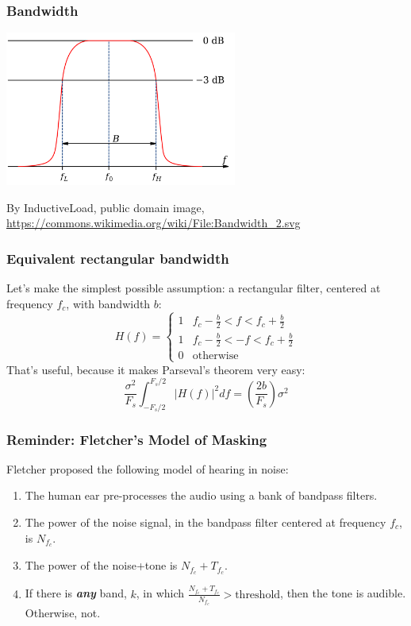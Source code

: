 \documentclass{beamer}
\begin{document}
\begin{frame}
  \frametitle{Bandwidth}

  \centerline{\includegraphics[height=2in]{Bandwidth_2.png}}
  \begin{tiny}
    By InductiveLoad, public domain image,
    \url{https://commons.wikimedia.org/wiki/File:Bandwidth_2.svg}
  \end{tiny}
\end{frame}

\begin{frame}
  \frametitle{Equivalent rectangular bandwidth}

  Let's make the simplest possible assumption: a rectangular filter,
  centered at frequency $f_c$, with bandwidth $b$:
  \[
  H(f) = \begin{cases}
    1 & f_c-\frac{b}{2} < f <f_c+\frac{b}{2}\\
    1 & f_c-\frac{b}{2} < -f < f_c+\frac{b}{2}\\
    0 & \mbox{otherwise}
  \end{cases}
  \]
  That's useful, because it makes Parseval's theorem very easy:
  \[
  \frac{\sigma^2}{F_s}\int_{-F_s/2}^{F_s/2} |H(f)|^2 df = \left(\frac{2b}{F_s}\right)\sigma^2
  \]
\end{frame}
  
\begin{frame}
  \frametitle{Reminder: Fletcher's Model of Masking}

  Fletcher proposed the following model of hearing in noise:
  \begin{enumerate}
  \item The human ear pre-processes  the audio using a bank of bandpass filters.
  \item The power of the noise signal, in the 
    bandpass filter centered at frequency $f_c$, is $N_{f_c}$.
  \item The power of the noise+tone is $N_{f_c}+T_{f_c}$.
  \item If there is {\bf\em any} band, $k$, in which
    $\frac{N_{f_c}+T_{f_c}}{N_{f_c}}>\mbox{threshold}$, then the tone is audible.
    Otherwise, not.
  \end{enumerate}
\end{frame}
\end{document}
